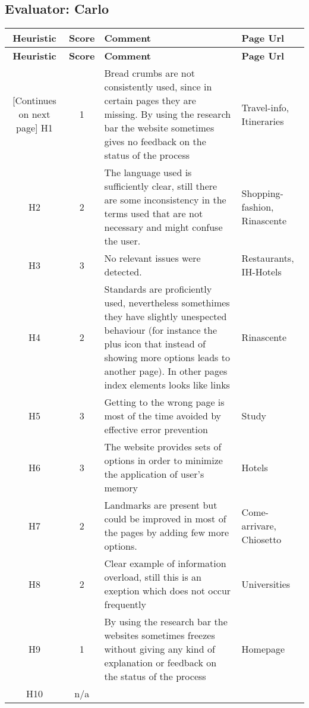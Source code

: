 \subsection{Evaluator: Carlo}
\begin{tabularx}{\linewidth}{c c X p{3cm}}
    \textbf{Heuristic} & \textbf{Score} & \textbf{Comment} & \textbf{Page Url}
    \\ \midrule
    \endfirsthead
    \toprule
    \textbf{Heuristic} & \textbf{Score} & \textbf{Comment} & \textbf{Page Url}
    \\ \midrule
    \endhead
    \midrule
    \footnotesize [Continues on next page]
    \endfoot
    \bottomrule
    \endlastfoot
    H1 & 1 & Bread crumbs are not consistently used, since in certain pages they are missing. By using the research bar the website sometimes gives no feedback on the status of the process & Travel-info, Itineraries\\ \midrule
    H2 & 2 & The language used is sufficiently clear, still there are some inconsistency in the terms used that are not necessary and might confuse the user. & Shopping-fashion, Rinascente \\ \midrule
    H3 & 3 & No relevant issues were detected. & Restaurants, IH-Hotels\\ \midrule
    H4 & 2 & Standards are proficiently used, nevertheless somethimes they have slightly unespected behaviour (for instance the plus icon that instead of showing more options leads to another page). In other pages index elements looks like links & Rinascente \\ \midrule
    H5 & 3 & Getting to the wrong page is most of the time avoided by effective error prevention & Study\\ \midrule
    H6 & 3 & The website provides sets of options in order to minimize the application of user's memory & Hotels\\ \midrule
    H7 & 2 & Landmarks are present but could be improved in most of the pages by adding few more options. & Come-arrivare, Chiosetto\\ \midrule
    H8 & 2 & Clear example of information overload, still this is an exeption which does not occur frequently & Universities\\ \midrule
    H9 & 1 & By using the research bar the websites sometimes freezes without giving any kind of explanation or feedback on the status of the process & Homepage\\ \midrule
    H10 & n/a & &
\end{tabularx}
    
